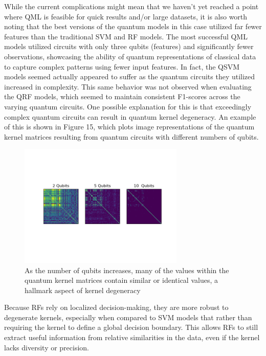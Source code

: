 \documentclass[11pt, oneside]{article}   	%
\begin{document}
While the current complications might mean that we haven't yet reached a point where QML is feasible for quick results and/or large datasets, it is also worth noting that the best versions of the quantum models in this case utilized far fewer features than the traditional SVM and RF models. The most successful QML models utilized circuits with only three qubits (features) and significantly fewer observations, showcasing the ability of quantum representations of classical data to capture complex patterns using fewer input features. In fact, the QSVM models seemed actually appeared to suffer as the quantum circuits they utilized increased in complexity. This same behavior was not observed when evaluating the QRF models, which seemed to maintain consistent F1-scores across the varying quantum circuits. One possible explanation for this is that exceedingly complex quantum circuits can result in quantum kernel degeneracy. An example of this is shown in Figure 15, which plots image representations of the quantum kernel matrices resulting from quantum circuits with different numbers of qubits.

\begin{figure}[h!]
	\centering
	\includegraphics[width=0.7\textwidth]{figures/fig_15.png}
	\captionsetup{font=small} 
	\caption{As the number of qubits increases, many of the values within the quantum kernel matrices contain similar or identical values, a hallmark aspect of kernel degeneracy}
	\label{fig15}
\end{figure}

Because RFs rely on localized decision-making, they are more robust to degenerate kernels, especially when compared to SVM models that rather than requiring the kernel to define a global decision boundary. This allows RFs to still extract useful information from relative similarities in the data, even if the kernel lacks diversity or precision.  \\
\end{document}
